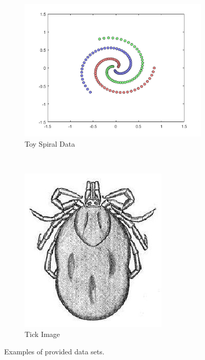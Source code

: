 \documentclass[a4paper, 10pt, conference]{ieeeconf}
\begin{document}
\begin{figure}[!ht]
  \captionsetup[subfigure]{position=b}
  \centering
    \begin{subfigure}{0.45\linewidth}
      \includegraphics[width=\textwidth]{img/toy_spiral}
      \caption{Toy Spiral Data}
      \label{fig:toy_spiral}
    \end{subfigure}
    ~
    \begin{subfigure}{0.45\linewidth}
      \includegraphics[width=\textwidth]{img/tick}
      \caption{Tick Image}
      \label{fig:tick_img}
    \end{subfigure}

	\caption{Examples of provided data sets.}
  \label{fig:example_data}
\end{figure}
\end{document}
